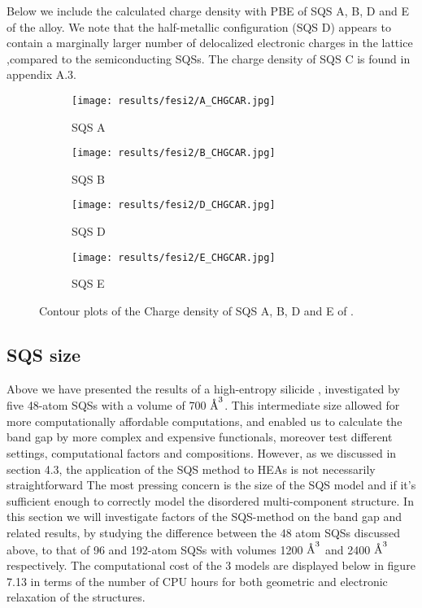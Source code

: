 Below we include the calculated charge density with PBE of SQS A, B, D and E of the  alloy. We note that the half-metallic configuration (SQS D) appears to contain a marginally larger number of delocalized electronic charges in the lattice ,compared to the semiconducting SQSs. The charge density of SQS C is found in appendix A.3.

\begin{figure}[H]
\begin{subfigure}{.5\textwidth}
\texttt{[image: results/fesi2/A\_CHGCAR.jpg]}
\caption{SQS A}
\end{subfigure}
\begin{subfigure}{.5\textwidth}
\texttt{[image: results/fesi2/B\_CHGCAR.jpg]}
\caption{SQS B}
\end{subfigure}
\begin{subfigure}{.5\textwidth}
\texttt{[image: results/fesi2/D\_CHGCAR.jpg]}
\caption{SQS D}
\end{subfigure}
\begin{subfigure}{.5\textwidth}
\texttt{[image: results/fesi2/E\_CHGCAR.jpg]}
\caption{SQS E}
\end{subfigure}
\caption{Contour plots of the Charge density of SQS A, B, D and E of .}
\end{figure}


\newpage
\subsection{SQS size}
Above we have presented the results of a high-entropy silicide , investigated by five 48-atom SQSs with a volume of 700 $\AA ^3$. This intermediate size allowed for more computationally affordable computations, and enabled us to calculate the band gap by more complex and expensive functionals, moreover test different settings, computational factors and compositions. However, as we discussed in section 4.3, the application of the SQS method to HEAs is not necessarily straightforward  The most pressing concern is the size of the SQS model and if it's sufficient enough to correctly model the disordered multi-component structure. In this section we will investigate factors of the SQS-method on the band gap and related results, by studying the difference between the 48 atom SQSs discussed above, to that of 96 and 192-atom SQSs with volumes 1200 $\AA ^3$ and 2400 $\AA ^3$ respectively. The computational cost of the 3 models are displayed below in figure 7.13 in terms of the number of CPU hours for both geometric and electronic relaxation of the structures.

